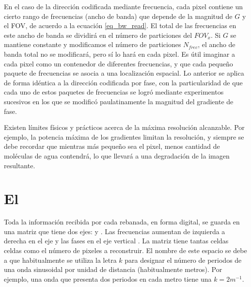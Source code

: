 En el caso de la dirección codificada mediante frecuencia, cada pixel contiene un cierto rango de frecuencias (ancho de banda) que depende de la magnitud de $G$ y el FOV, de acuerdo a la ecuación \ref{eq_bw_read}. El total de las frecuencias en este ancho de banda se dividirá en el número de particiones del $FOV_{x}$. Si $G$ se mantiene constante y modificamos el número de particiones $N_{frec}$, el ancho de banda total no se modificará, pero sí lo hará en cada pixel. Es útil imaginar a cada pixel como un contenedor de diferentes frecuencias, y que cada pequeño paquete de frecuencias se asocia a una localización espacial. Lo anterior se aplica de forma idéntica a la dirección codificada por fase, con la particularidad de que cada uno de estos paquetes de frecuencias se logró mediante experimentos sucesivos en los que se modificó paulatinamente la magnitud del gradiente de fase.


Existen límites físicos y prácticos acerca de la máxima resolución alcanzable. Por ejemplo, la potencia máxima de los gradientes limitan la resolución, y siempre se debe recordar que mientras más pequeño sea el pixel, menos cantidad de moléculas de agua contendrá, lo que llevará a una degradación de la imagen resultante.


\section{El \espaciok}
Toda la información recibida por cada rebanada, en forma digital, se guarda en una matriz que tiene dos ejes: \kx y \ky. Las frecuencias aumentan de izquierda a derecha en el eje \kx y las fases en el eje vertical \ky. La matriz tiene tantas celdas celdas como el número de pixeles a reconstruir.  El nombre de este espacio se debe a que habitualmente se utiliza la letra $k$ para designar el número de periodos de una onda sinusoidal por unidad de distancia (habitualmente metros). Por ejemplo, una onda que presenta dos periodos en cada metro tiene una $k = 2 m^{-1}$.

